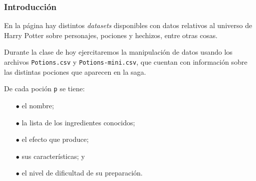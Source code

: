 \newcommand{\docente}{Prof. Camila Di Ielsi}



\usepackage{enumitem}
\usepackage{pifont}



\begin{frame}
\titlepage
\end{frame}

\begin{frame}\frametitle{Introducci\'on}
En la p\'agina {\scriptsize{}} hay distintos {\it datasets} disponibles con datos relativos al universo de Harry Potter sobre personajes, pociones y hechizos, entre otras cosas. \bigskip

Durante la clase de hoy ejercitaremos la manipulaci\'on de datos usando los archivos {\tt Potions.csv} y {\tt Potions-mini.csv}, que cuentan con informaci\'on sobre las distintas pociones que aparecen en la saga. \bigskip

De cada poci\'on {\tt p} se tiene:

\begin{itemize}
\item [$\bullet$] el nombre;
\item [$\bullet$] la lista de los ingredientes conocidos;
\item [$\bullet$] el efecto que produce;
\item [$\bullet$] sus caracter\'isticas; y
\item [$\bullet$] el nivel de dificultad de su preparaci\'on.
\end{itemize}

\end{frame}

